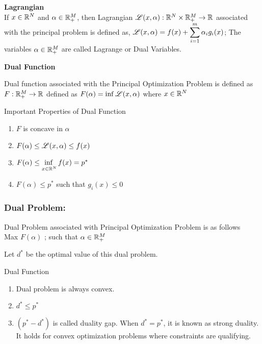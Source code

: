 \documentclass[a4paper,english,12pt]{article}
\begin{document}
{\begin{defn}{\textbf{Lagrangian}}\\
	If $x \in \mathbb{R}^N$ and $\alpha \in \mathbb{R}_+^M$, then Lagrangian $\mathscr{L}(x,\alpha):\mathbb{R}^N\times\mathbb{R}_+^M\to\mathbb{R}$ associated with the principal problem is defined as,   $\mathscr{L}(x,\alpha) = f(x) + \displaystyle{\sum_{i=1}^{m}\alpha_i g_i(x)}$;
	The variables $\alpha \in \mathbb{R}_+^M$ are called Lagrange or Dual Variables.
\end{defn}

\begin{defn}{\textbf{Dual Function}}
\begin{flushleft}
	Dual function associated with the Principal Optimization Problem is defined as $F:\mathbb{R}_+^M\to\mathbb{R}$ defined as $F(\alpha) = \inf\mathscr{L}(x,\alpha)$ where $x\in \mathbb{R}^N$
\end{flushleft}	
\end{defn}

\begin{rem}{Important Properties of Dual Function}\\

	\begin{enumerate}
		\item $F$ is concave in $\alpha$
		\item $F(\alpha) \leq \mathscr{L}(x,\alpha)\leq f(x)$
		\item $F(\alpha)  \leq \adjustlimits \inf_{x\in \R^N} f(x) = p^*$
		\item $F(\alpha) \leq p^*$ such that $g_i(x) \leq 0$
	\end{enumerate}
	

\end{rem}
\subsubsection{Dual Problem:}
Dual Problem associated with Principal Optimization Problem is as follows \\
Max $F(\alpha)$ ; such that $\alpha \in \mathbb{R}_+^M$
\begin{note}
	Let $d^*$ be the optimal value of this dual problem.
\end{note}

\begin{rem}{Dual Function}
	\begin{enumerate}
		\item Dual problem is always convex.
		\item $d^* \leq p^*$
		\item $(p^* - d^*)$ is called duality gap. When $d^* = p^*$, it is known as strong duality. It holds for convex optimization problems where constraints are qualifying. 
	\end{enumerate}
	

\end{rem}}
\end{document}
